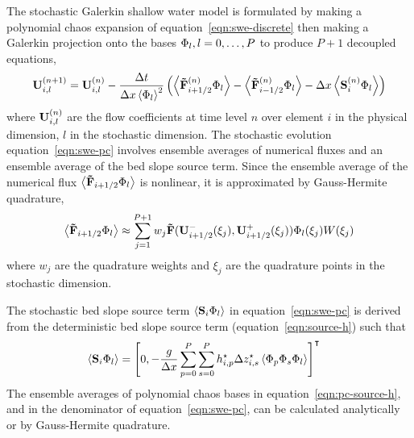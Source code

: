 The stochastic Galerkin shallow water model is formulated by making a polynomial chaos expansion of equation~\eqref{eqn:swe-discrete} then making a Galerkin projection onto the bases $\Phi_l, l = 0, \ldots, P$ to produce $P + 1$ decoupled equations,
\begin{align}
    \mathbf{U}_{i,l}^{(n+1)} = \mathbf{U}_{i,l}^{(n)}
    - \frac{\Delta t}{\Delta x \left\langle \Phi_l \right\rangle^2}
    \left(
    \left\langle \mathbf{\tilde{F}}_{i+1/2}^{(n)} \Phi_l \right\rangle
    -
    \left\langle \mathbf{\tilde{F}}_{i-1/2}^{(n)} \Phi_l \right\rangle
    - \Delta x \left\langle \mathbf{S}_i^{(n)} \Phi_l \right\rangle
    \right) \label{eqn:swe-pc}
\end{align}
where $\mathbf{U}_{i,l}^{(n)}$ are the flow coefficients at time level $n$ over element $i$ in the physical dimension, $l$ in the stochastic dimension.
The stochastic evolution equation~\eqref{eqn:swe-pc} involves ensemble averages of numerical fluxes and an ensemble average of the bed slope source term.
Since the ensemble average of the numerical flux $\left\langle \mathbf{\tilde{F}}_{i+1/2} \Phi_l \right\rangle$ is nonlinear, it is approximated by Gauss-Hermite quadrature,
\begin{align}
    \left\langle \mathbf{\tilde{F}}_{i+1/2} \Phi_l \right\rangle
    \approx
    \sum_{j=1}^{P+1} w_j
    \mathbf{\tilde{F}}( \mathbf{U}_{i+1/2}^-(\xi_j), \mathbf{U}_{i+1/2}^+(\xi_j) )
    \Phi_l(\xi_j) W(\xi_j) \label{eqn:pc-flux}
\end{align}
where $w_j$ are the quadrature weights and $\xi_j$ are the quadrature points in the stochastic dimension.

The stochastic bed slope source term $\left\langle \mathbf{S}_i \Phi_l \right\rangle$ in equation~\eqref{eqn:swe-pc} is derived from the deterministic bed slope source term (equation~\ref{eqn:source-h}) such that
\begin{align}
    \left\langle \mathbf{S}_i \Phi_l \right\rangle &= \left[ 0,
    - \frac{g}{\Delta x}
    \sum_{p=0}^P \sum_{s=0}^P
    h^\star_{i,p} \Delta z^\star_{i,s}
    \left\langle \Phi_p \Phi_s \Phi_l \right\rangle
    \right]^\intercal
\label{eqn:pc-source-h}
\end{align}
The ensemble averages of polynomial chaos bases in equation~\eqref{eqn:pc-source-h}, and in the denominator of equation~\eqref{eqn:swe-pc}, can be calculated analytically or by Gauss-Hermite quadrature.

